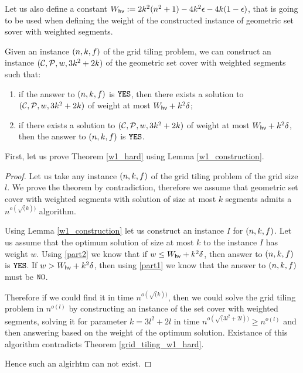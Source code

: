 Let us also define a constant $W_{\mathsf{hv}} := 2k^2(n^2+1) -4k^2\epsilon -4k(1-\epsilon)$,
that is going to be used when defining the weight of the constructed
instance of geometric set sover with weighted segments.


\begin{lemma}
\label{w1_construction}
Given an instance $(n,k,f)$ of the grid tiling problem,
we can construct an instance $(\mathcal{C}, \mathcal{P}, w, 3k^2+2k)$ of the geometric set cover
with weighted segments such that:
\begin{enumerate}[label={(\arabic*)}]
\item \label{part1} if the answer to $(n,k,f)$ is $\texttt{YES}$, then there exists a solution
to $(\mathcal{C}, \mathcal{P}, w, 3k^2+2k)$ of weight at most $W_{\mathsf{hv}}+k^2\delta$;
\item \label{part2} if there exists a solution to $(\mathcal{C}, \mathcal{P}, w, 3k^2+2k)$ of weight at most $W_{\mathsf{hv}}+k^2\delta$,
then the answer to $(n,k,f)$ is $\texttt{YES}$.
\end{enumerate}
\end{lemma}


First, let us prove Theorem \ref{w1_hard} using Lemma \ref{w1_construction}.

\begin{proof}
Let us take any instance $(n,k,f)$ of the grid tiling problem
of the grid size $l$.
We prove the theorem by contradiction, therefore we assume
that geometric set cover with weighted segments
with solution of size at most $k$ segments admits a $n^{o(\sqrt(k))}$ algorithm.

Using Lemma \ref{w1_construction} let us construct an instance $I$
for $(n,k,f)$.
Let us assume that the optimum solution of size at most $k$
to the instance $I$ has weight $w$.
Using \ref{part2} we know that if $w \le W_{\mathsf{hv}}+k^2\delta$,
then answer to $(n,k,f)$ is $\texttt{YES}$.
If $w > W_{\mathsf{hv}}+k^2\delta$, then using \ref{part1}
we know that the answer to $(n,k,f)$ must be $\texttt{NO}$.

Therefore if we could find it in time $n^{o(\sqrt(k))}$,
then we could solve the grid tiling problem
in $n^{o(l)}$ by constructing an instance of the set cover with
weighted segments, solving it 
for parameter $k = 3l^2+2l$ in time $n^{o(\sqrt(3l^2+2l))} \ge n^{o(l)}$
and then answering based on the weight
of the optimum solution.
Existance of this algorithm contradicts Theorem
\ref{grid_tiling_w1_hard}.

Hence such an algirhtm can not exist.
\end{proof}

